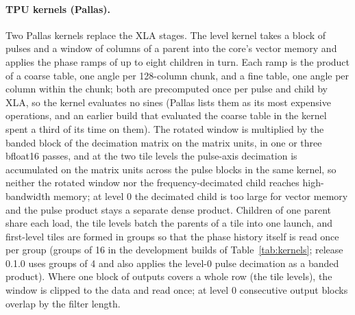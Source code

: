 \documentclass[11pt]{article}
\begin{document}
\paragraph{TPU kernels (Pallas).} Two Pallas kernels replace the XLA stages. The level kernel takes a block of pulses and a window of columns of a parent into the core's vector memory and applies the phase ramps of up to eight children in turn. Each ramp is the product of a coarse table, one angle per 128-column chunk, and a fine table, one angle per column within the chunk; both are precomputed once per pulse and child by XLA, so the kernel evaluates no sines (Pallas lists them as its most expensive operations, and an earlier build that evaluated the coarse table in the kernel spent a third of its time on them). The rotated window is multiplied by the banded block of the decimation matrix on the matrix units, in one or three bfloat16 passes, and at the two tile levels the pulse-axis decimation is accumulated on the matrix units across the pulse blocks in the same kernel, so neither the rotated window nor the frequency-decimated child reaches high-bandwidth memory; at level 0 the decimated child is too large for vector memory and the pulse product stays a separate dense product. Children of one parent share each load, the tile levels batch the parents of a tile into one launch, and first-level tiles are formed in groups so that the phase history itself is read once per group (groups of 16 in the development builds of Table~\ref{tab:kernels}; release 0.1.0 uses groups of 4 and also applies the level-0 pulse decimation as a banded product). Where one block of outputs covers a whole row (the tile levels), the window is clipped to the data and read once; at level 0 consecutive output blocks overlap by the filter length.
\end{document}
